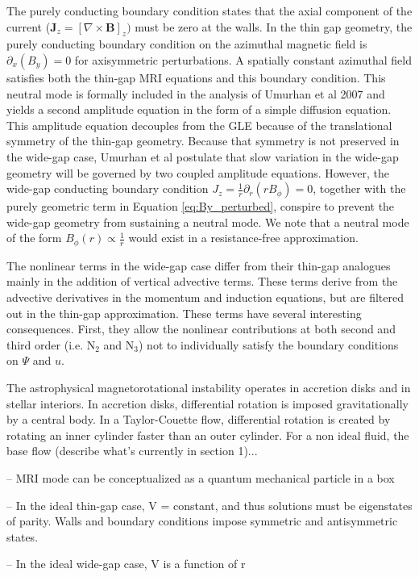 \documentclass{paper}
\begin{document}
The purely conducting boundary condition states that the axial component of the current ($\mathbf{J}_z = [\nabla \times \mathbf{B}]_z)$ must be zero at the walls. In the thin gap geometry, the purely conducting boundary condition on the azimuthal magnetic field is $\partial_x(B_y) = 0$ for axisymmetric perturbations. A spatially constant azimuthal field satisfies both the thin-gap MRI equations and this boundary condition. This neutral mode is formally included in the analysis of Umurhan et al 2007 and yields a second amplitude equation in the form of a simple diffusion equation. This amplitude equation decouples from the GLE because of the translational symmetry of the thin-gap geometry. Because that symmetry is not preserved in the wide-gap case, Umurhan et al postulate that slow variation in the wide-gap geometry will be governed by two coupled amplitude equations. However, the wide-gap conducting boundary condition $J_z = \frac{1}{r} \partial_r (r B_\phi) = 0$, together with the purely geometric term in Equation \ref{eq:By_perturbed}, conspire to prevent the wide-gap geometry from sustaining a neutral mode. We note that a neutral mode of the form $B_\phi(r) \propto \frac{1}{r}$ would exist in a resistance-free approximation.

The nonlinear terms in the wide-gap case differ from their thin-gap analogues mainly in the addition of vertical advective terms. These terms derive from the advective derivatives in the momentum and induction equations, but are filtered out in the thin-gap approximation. These terms have several interesting consequences. First, they allow the nonlinear contributions at both second and third order (i.e. N$_2$ and N$_3$) not to individually satisfy the boundary conditions on $\Psi$ and $u$. 

The astrophysical magnetorotational instability operates in accretion disks and in stellar interiors. In accretion disks, differential rotation is imposed gravitationally by a central body. In a Taylor-Couette flow, differential rotation is created by rotating an inner cylinder faster than an outer cylinder. For a non ideal fluid, the base flow (describe what's currently in section 1)...

-- MRI mode can be conceptualized as a quantum mechanical particle in a box

-- In the ideal thin-gap case, V = constant, and thus solutions must be eigenstates of parity. Walls and boundary conditions impose symmetric and antisymmetric states.

-- In the ideal wide-gap case, V is a function of r
\end{document}
